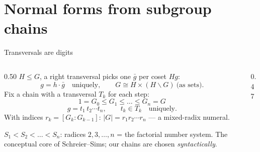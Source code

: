 \PaperPart
\section{Normal forms from subgroup chains}

\begin{frame}{Transversals are digits \InPaper}
\begin{columns}[c]
\begin{column}{0.50\textwidth}
$H \le G$, a \alert{right transversal} picks one $\bar g$ per coset $Hg$:
\[ g = h\cdot\bar g \quad\text{uniquely},\qquad G \cong H\times (H\backslash G)\ \text{(as sets)}. \]
Fix a chain with a transversal $T_k$ for each step:
\[ 1 = G_0 \le G_1 \le \dots \le G_n = G \]
\[ g = t_1\,t_2\cdots t_n,\qquad t_k\in T_k\quad\text{uniquely.} \]
With indices $r_k = [G_k:G_{k-1}]$: $|G| = r_1 r_2\cdots r_n$ --- a
\alert{mixed-radix numeral}.

\vspace{4pt}
\small $S_1<S_2<\dots<S_n$: radices $2,3,\dots,n$ = the factorial number
system. The conceptual core of \alert{Schreier--Sims}; our chains are
chosen \emph{syntactically}.
\end{column}
\begin{column}{0.47\textwidth}
\centering
{}
\end{column}
\end{columns}
\end{frame}

